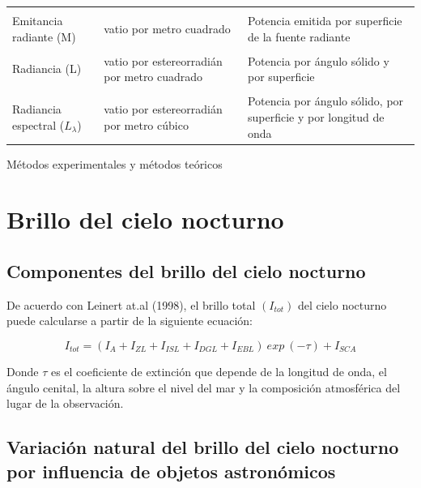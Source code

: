 \begin{table}[]
{\begin{tabular}{lll}
                                    &                                             &                                                                   \\
Emitancia radiante (M)              & vatio por metro cuadrado                    & Potencia emitida por superficie de la fuente radiante             \\
                                    &                                             &                                                                   \\
Radiancia (L)                       & vatio por estereorradián por metro cuadrado & Potencia por ángulo sólido y por superficie                       \\
                                    &                                             &                                                                   \\
Radiancia espectral ($L_{\lambda}$) & vatio por estereorradián por metro cúbico   & Potencia por ángulo sólido, por superficie y por longitud de onda
\end{tabular}%
}
\end{table}

Métodos experimentales y métodos teóricos


\section{Brillo del cielo nocturno}

\subsection{Componentes del brillo del cielo nocturno}

De acuerdo con Leinert at.al (1998), el brillo total $(I_{tot})$ del cielo nocturno puede calcularse a partir de la siguiente ecuación:

\begin{equation}\label{eq:ej}
I_{tot}=(I_A + I_{ZL} + I_{ISL} + I_{DGL} + I_{EBL})\ exp \ (-\tau) + I_{SCA}
\end{equation}

Donde $\tau$ es el coeficiente de extinción que depende de la longitud de onda, el ángulo cenital, la altura sobre el nivel del mar y la composición atmosférica del lugar de la observación.


\subsection{Variación natural del brillo del cielo nocturno por influencia de objetos astronómicos}


